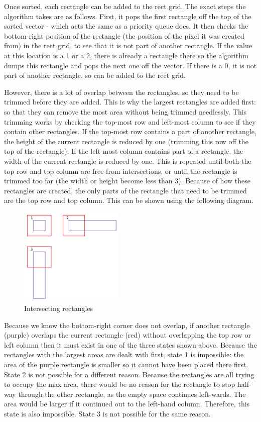 \documentclass[titlepage]{article}
\begin{document}
Once sorted, each rectangle can be added to the rect grid. The exact steps the algorithm takes are as follows. First, it pops the first rectangle off the top of the sorted vector - which acts the same as a priority queue does. It then checks the bottom-right position of the rectangle (the position of the pixel it was created from) in the rect grid, to see that it is not part of another rectangle. If the value at this location is a 1 or a 2, there is already a rectangle there so the algorithm dumps this rectangle and pops the next one off the vector. If there is a 0, it is not part of another rectangle, so can be added to the rect grid. 

However, there is a lot of overlap between the rectangles, so they need to be trimmed before they are added. This is why the largest rectangles are added first: so that they can remove the most area without being trimmed needlessly. This trimming works by checking the top-most row and left-most column to see if they contain other rectangles. If the top-most row contains a part of another rectangle, the height of the current rectangle is reduced by one (trimming this row off the top of the rectangle). If the left-most column contains part of a rectangle, the width of the current rectangle is reduced by one. This is repeated until both the top row and top column are free from intersections, or until the rectangle is trimmed too far (the width or height become less than 3). Because of how these rectangles are created, the only parts of the rectangle that need to be trimmed are the top row and top column. This can be shown using the following diagram.

\begin{figure}[H]
  \centering
  \includegraphics[width=5cm]{overlap.png}
  \caption{Intersecting rectangles}
  \label{fig:dijk}
\end{figure}

Because we know the bottom-right corner does not overlap, if another rectangle (purple) overlaps the current rectangle (red) without overlapping the top row or left column then it must exist in one of the three states shown above. Because the rectangles with the largest areas are dealt with first, state 1 is impossible: the area of the purple rectangle is smaller so it cannot have been placed there first. State 2 is not possible for a different reason. Because the rectangles are all trying to occupy the max area, there would be no reason for the rectangle to stop half-way through the other rectangle, as the empty space continues left-wards. The area would be larger if it continued out to the left-hand column. Therefore, this state is also impossible. State 3 is not possible for the same reason.
\end{document}
